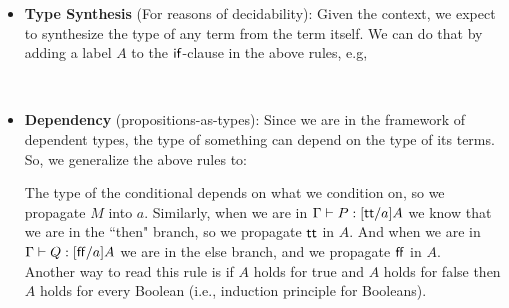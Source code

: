 \documentclass{article}
\newcommand{\G}{\Gamma}
\begin{document}
\begin{itemize}
    \item {\bf Type Synthesis} (For reasons of decidability): Given the context, we expect to synthesize the type of any term from the term itself. We can do that by adding a label $A$ to the $\sfif$-clause in the above rules, e.g,
   \begin{mathpar}
    \end{mathpar}\\ 
    \item {\bf Dependency} (propositions-as-types): Since we are in the framework of dependent types, the type of something can depend on the type of its terms. So, we generalize the above rules to:\\
       \begin{mathpar}
    \end{mathpar}
    The type of the conditional depends on what we condition on, so we propagate $M$ into $a$. Similarly, when we are in $\hasEF{\Gamma}{P}{[\ett/a]A}$ we know that we are in the ``then" branch, so we propagate $\ett$ in $A$. And when we are in $\hasEF{\Gamma}{Q}{[\eff/a]A}$ we are in the else branch, and we propagate $\eff$ in $A$.\\
    Another way to read this rule is if $A$ holds for true and $A$ holds for false then $A$ holds for every Boolean (i.e., induction principle for Booleans).


\end{itemize}
\end{document}
